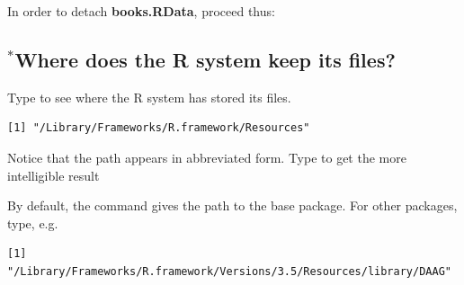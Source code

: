 In order to detach \textbf{books.RData}, proceed
thus:
\begin{knitrout}
\color{fgcolor}\begin{kframe}
\begin{alltt}
\hlstd{(}\hlstd{)}
\end{alltt}
\end{kframe}
\end{knitrout}

\subsection{$^*$Where does the R system keep its files?}


Type  to see where the R system has stored its files.
\begin{knitrout}
\color{fgcolor}\begin{kframe}
\begin{alltt}
\hlstd{()}
\end{alltt}
\begin{verbatim}
[1] "/Library/Frameworks/R.framework/Resources"
\end{verbatim}
\end{kframe}
\end{knitrout}
Notice that the path appears in abbreviated form.  Type
 to get the more intelligible result\\

By default, the command  gives the path to the
base package.  For other packages, type, e.g.

\begin{fullwidth}

\begin{knitrout}
\color{fgcolor}\begin{kframe}
\begin{alltt}
\hlstd{(}\hlstd{=}\hlstd{)}
\end{alltt}
\begin{verbatim}
[1] "/Library/Frameworks/R.framework/Versions/3.5/Resources/library/DAAG"
\end{verbatim}
\end{kframe}
\end{knitrout}

\end{fullwidth}

